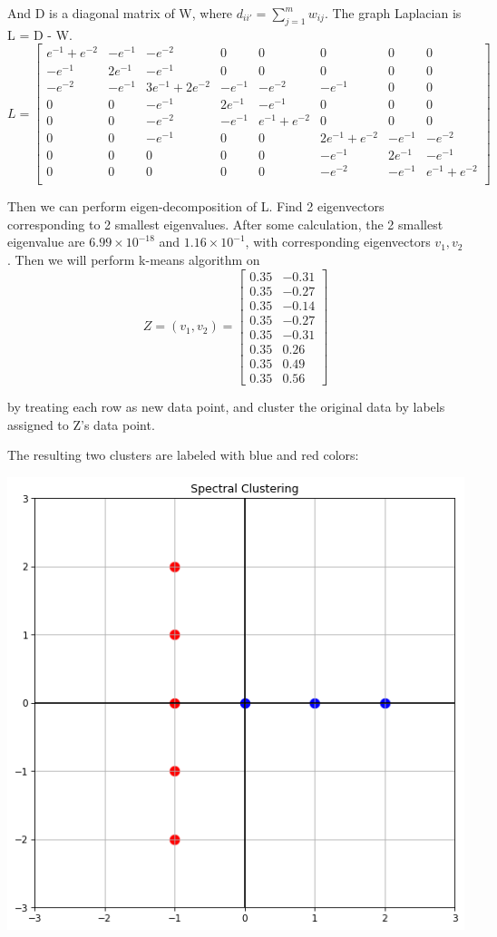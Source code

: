 \documentclass{article}
\begin{document}
And D is a diagonal matrix of W, where $d_{ii'} = \sum_{j=1}^m w_{ij}$. The graph Laplacian is L = D - W. 
$$
L = 
\begin{bmatrix}
e^{-1}+e^{-2}&-e^{-1}&-e^{-2}&0&0&0&0&0\\
-e^{-1}&2e^{-1}&-e^{-1}&0&0&0&0&0\\
-e^{-2}&-e^{-1}&3e^{-1}+2e^{-2}&-e^{-1}&-e^{-2}&-e^{-1}&0&0\\
0&0&-e^{-1}&2e^{-1}&-e^{-1}&0&0&0\\
0&0&-e^{-2}&-e^{-1}&e^{-1}+e^{-2}&0&0&0\\
0&0&-e^{-1}&0&0&2e^{-1}+e^{-2}&-e^{-1}&-e^{-2}\\
0&0&0&0&0&-e^{-1}&2e^{-1}&-e^{-1}\\
0&0&0&0&0&-e^{-2}&-e^{-1}&e^{-1}+e^{-2}\\
\end{bmatrix}
$$

Then we can perform eigen-decomposition of L. Find 2 eigenvectors corresponding to 2 smallest eigenvalues. 
After some calculation, the 2 smallest eigenvalue are $6.99\times10^{-18}$ and $1.16\times10^{-1}$, with corresponding eigenvectors $v_1, v_2$. Then we will perform k-means algorithm on
$$
Z = (v_1, v_2) =  
\begin{bmatrix}
0.35&-0.31\\
0.35&-0.27\\
0.35&-0.14\\
0.35&-0.27\\
0.35&-0.31\\
0.35&0.26\\
0.35&0.49\\
0.35&0.56
\end{bmatrix}
$$

by treating each row as new data point, and cluster the original data by labels assigned to Z's data point.

The resulting two clusters are labeled with blue and red colors:
\begin{center}
\includegraphics[scale=0.5]{result.png}
\end{center}
\end{document}
